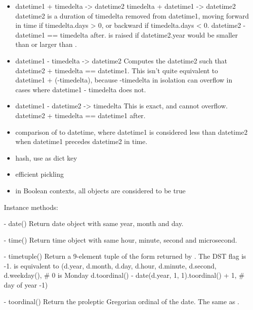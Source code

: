 \begin{itemize}
  \item
    datetime1 + timedelta -> datetime2
    timedelta + datetime1 -> datetime2
    datetime2 is a duration of timedelta removed from datetime1, moving
    forward in time if timedelta.days > 0, or backward if
    timedelta.days < 0.  datetime2 - datetime1 == timedelta after.
     is raised if datetime2.year would be
    smaller than  or larger than .

  \item
    datetime1 - timedelta -> datetime2
    Computes the datetime2 such that datetime2 + timedelta == datetime1.
    This isn't quite equivalent to datetime1 + (-timedelta), because
    -timedelta in isolation can overflow in cases where
    datetime1 - timedelta does not.

  \item
    datetime1 - datetime2 -> timedelta
    This is exact, and cannot overflow.
    datetime2 + timedelta == datetime1 after.

  \item
    comparison of  to datetime, where datetime1 is
    considered less than datetime2 when datetime1 precedes datetime2
    in time.

  \item
    hash, use as dict key

  \item
    efficient pickling

  \item
    in Boolean contexts, all  objects are considered
    to be true
\end{itemize}

Instance methods:

  - date()
    Return date object with same year, month and day.

  - time()
    Return time object with same hour, minute, second and microsecond.

  - timetuple()
    Return a 9-element tuple of the form returned by
    .
    The DST flag is -1.    is equivalent to
        (d.year, d.month, d.day,
         d.hour, d.minute, d.second,
         d.weekday(),  \# 0 is Monday
         d.toordinal() - date(d.year, 1, 1).toordinal() + 1, \# day of year
         -1)

  - toordinal()
    Return the proleptic Gregorian ordinal of the date.  The same as
    .

